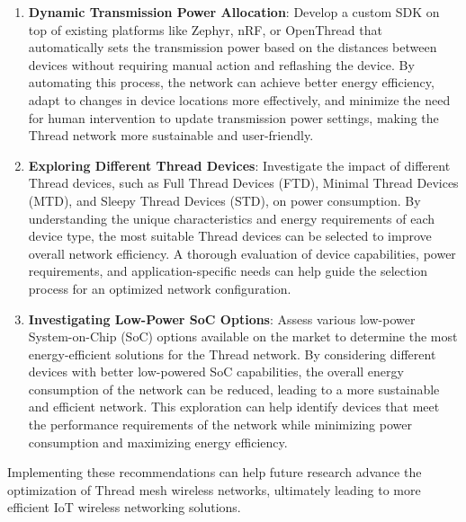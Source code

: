 \begin{enumerate}
    \item \textbf{Dynamic Transmission Power Allocation}: Develop a custom SDK on top of existing platforms like Zephyr, nRF, or OpenThread that automatically sets the transmission power based on the distances between devices without requiring manual action and reflashing the device. By automating this process, the network can achieve better energy efficiency, adapt to changes in device locations more effectively, and minimize the need for human intervention to update transmission power settings, making the Thread network more sustainable and user-friendly.
    \item \textbf{Exploring Different Thread Devices}: Investigate the impact of different Thread devices, such as Full Thread Devices (FTD), Minimal Thread Devices (MTD), and Sleepy Thread Devices (STD), on power consumption. By understanding the unique characteristics and energy requirements of each device type, the most suitable Thread devices can be selected to improve overall network efficiency. A thorough evaluation of device capabilities, power requirements, and application-specific needs can help guide the selection process for an optimized network configuration.
    \item \textbf{Investigating Low-Power SoC Options}: Assess various low-power System-on-Chip (SoC) options available on the market to determine the most energy-efficient solutions for the Thread network. By considering different devices with better low-powered SoC capabilities, the overall energy consumption of the network can be reduced, leading to a more sustainable and efficient network. This exploration can help identify devices that meet the performance requirements of the network while minimizing power consumption and maximizing energy efficiency.
\end{enumerate}

Implementing these recommendations can help future research advance the optimization of Thread mesh wireless networks, ultimately leading to more efficient IoT wireless networking solutions.
